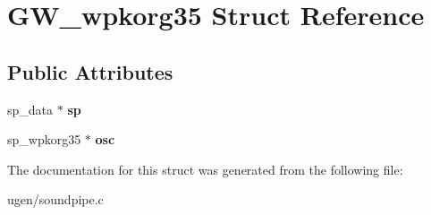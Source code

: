 \hypertarget{structGW__wpkorg35}{}\section{G\+W\+\_\+wpkorg35 Struct Reference}
\label{structGW__wpkorg35}
\subsection*{Public Attributes}
\begin{DoxyCompactItemize}
\item 
\hypertarget{structGW__wpkorg35_a3daf3369dbcb1b4f36d9de3711dc9627}{}\label{structGW__wpkorg35_a3daf3369dbcb1b4f36d9de3711dc9627} 
sp\+\_\+data $\ast$ {\bfseries sp}
\item 
\hypertarget{structGW__wpkorg35_add738cad353c19bbbea1a7c5c1eff6f5}{}\label{structGW__wpkorg35_add738cad353c19bbbea1a7c5c1eff6f5} 
sp\+\_\+wpkorg35 $\ast$ {\bfseries osc}
\end{DoxyCompactItemize}


The documentation for this struct was generated from the following file\+:\begin{DoxyCompactItemize}
\item 
ugen/soundpipe.\+c\end{DoxyCompactItemize}
